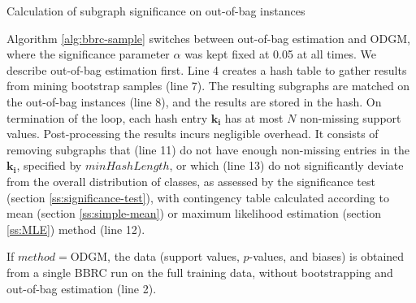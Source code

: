 \documentclass{sig-alternate}
\begin{document}
\begin{algorithm2e*}[t]
  \fontsize{8}{10}
  \selectfont
  \caption{Calculation of subgraph significance on out-of-bag instances\label{alg:bbrc-sample}}
\end{algorithm2e*}
Algorithm \ref{alg:bbrc-sample} switches between out-of-bag estimation and ODGM, where 
the significance parameter $\alpha$ was kept fixed at 0.05 at all times.
We describe out-of-bag estimation first. Line 4
creates a hash table to gather results from mining bootstrap samples 
(line 7). The resulting subgraphs are matched on the out-of-bag instances (line
8), and the results are stored in the hash. On termination of the loop, each hash
entry $\mathbf{k_i}$ has at most $N$ non-missing support values. Post-processing the results
incurs negligible overhead. It
consists of removing subgraphs that (line 11) do not have enough non-missing entries in the 
$\mathbf{k_i}$,
specified by $minHashLength$, or which (line 13) do not significantly
deviate from the overall distribution of classes, as assessed by the significance
test (section \ref{ss:significance-test}), with contingency table calculated
according to mean (section \ref{ss:simple-mean}) or maximum likelihood
estimation (section \ref{ss:MLE}) method (line 12). 

If $method=$ODGM, the data (support values, $p$-values, and biases) is obtained from a single BBRC run on the full training data, without bootstrapping and out-of-bag estimation (line 2).
\end{document}
